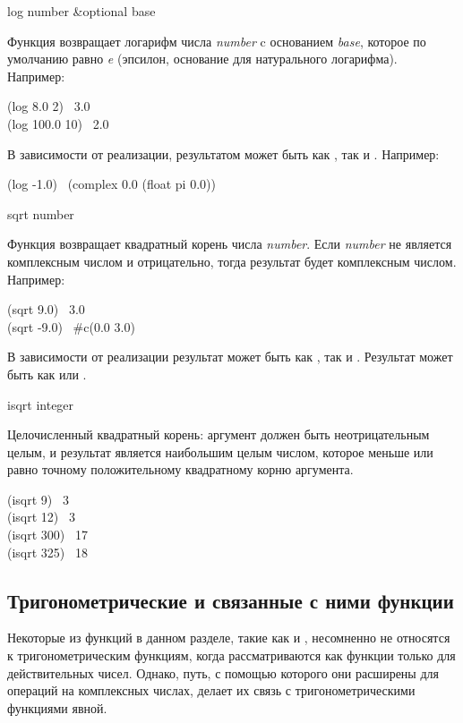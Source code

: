 \begin{defun}[Функция]
log number &optional base

Функция возвращает логарифм числа \emph{number} c основанием \emph{base},
которое по умолчанию равно \emph{e} (эпсилон, основание для натурального
логарифма).
Например:
\begin{lisp}
(log 8.0 2) \EV\ 3.0 \\
(log 100.0 10) \EV\ 2.0
\end{lisp}
В зависимости от реализации, результатом  может быть как ,
так и .
Например:
\begin{lisp}
(log -1.0) \EQ\ (complex 0.0 (float pi 0.0))
\end{lisp}
\end{defun}

\begin{defun}[Функция]
sqrt number

Функция возвращает квадратный корень числа \emph{number}.
Если \emph{number} не является комплексным числом и отрицательно, тогда
результат будет комплексным числом.
Например:
\begin{lisp}
(sqrt 9.0) \EV\ 3.0 \\
(sqrt -9.0) \EV\ \#c(0.0 3.0)
\end{lisp}
В зависимости от реализации результат  может быть как , так и
. Результат  может быть как  или .
\end{defun}

\begin{defun}[Функция]
isqrt integer

Целочисленный квадратный корень: аргумент должен быть неотрицательным целым, и
результат является наибольшим целым числом, которое меньше или равно точному
положительному квадратному корню аргумента.
\begin{lisp}
(isqrt 9) \EV\ 3 \\
(isqrt 12) \EV\ 3 \\
(isqrt 300) \EV\ 17 \\
(isqrt 325) \EV\ 18
\end{lisp}
\end{defun}

\subsection{Тригонометрические и связанные с ними функции}

Некоторые из функций в данном разделе, такие как  и ,
несомненно не относятся к тригонометрическим функциям, когда рассматриваются
как функции только для действительных чисел. Однако, путь, с помощью которого
они расширены для операций на комплексных числах, делает их связь с
тригонометрическими функциями явной.

